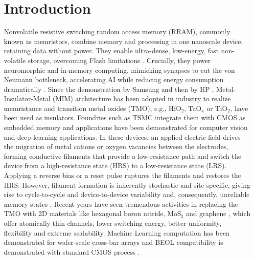 \documentclass[aip,apl,reprint,floatfix]{revtex4-2}
\begin{document}
\section{Introduction}
Nonvolatile resistive switching random access memory (RRAM), commonly known as memristors, combine memory and processing in one nanoscale device, retaining data without power. They enable ultra-dense, low-energy, fast non-volatile storage, overcoming Flash limitations \cite{6193402}. Crucially, they power neuromorphic and in-memory computing, mimicking synapses to cut the von Neumann bottleneck, accelerating AI while reducing energy consumption dramatically \cite{Yang2013Memristive}. Since the demonstration by Samsung \cite{1419232} and then by HP \cite{Strukov2008}, Metal-Insulator-Metal (MIM) architecture has been adopted in industry to realize memristance and transition metal oxides (TMO), e.g., HfO$_{2}$, TaO$_{x}$ or TiO$_{2}$, have been used as insulators.  Foundries such as TSMC integrate them with CMOS as embedded memory and applications have been demonstrated for computer vision and deep-learning applications\cite{TSMC}. In these devices, an applied electric field drives the migration of metal cations or oxygen vacancies between the electrodes, forming conductive filaments that provide a low-resistance path and switch the device from a high-resistance state (HRS) to a low-resistance state (LRS). Applying a reverse bias or a reset pulse ruptures the filaments and restores the HRS. However, filament formation is inherently stochastic and site-specific, giving rise to cycle-to-cycle and device-to-device variability and, consequently, unreliable memory states \cite{Roldan2023Variability}. Recent years have seen tremendous activities in replacing the TMO with 2D materials like hexagonal boron nitride\cite{Zhang2024Memristors}, MoS$_{2}$ \cite{MoS2} and graphene \cite{Standley}, which offer atomically thin channels, lower switching energy, better uniformity, flexibility and extreme scalability.  Machine Learning computation has been  demonstrated for wafer-scale cross-bar arrays \cite{Tang2022WaferScale} and BEOL compatibility is demonstrated with standard CMOS process \cite{Shi2018Electronic}.
\end{document}
